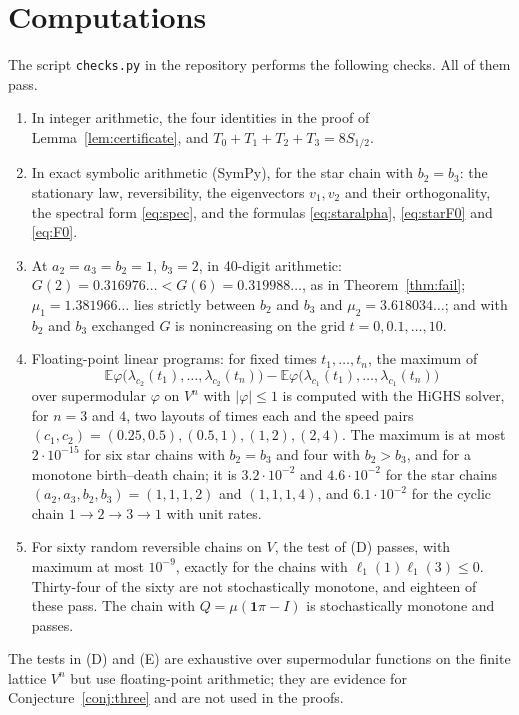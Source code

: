 \documentclass[11pt]{amsart}
\theoremstyle{remark}
\numberwithin{equation}{section}
\newcommand{\E}{\mathbb E}
\newcommand{\1}{\mathbf 1}
\begin{document}
\section{Computations}\label{sec:comp}

The script \texttt{checks.py} in the repository performs the following checks. All of them pass.
\begin{enumerate}[label=(\Alph*),leftmargin=*]
\item In integer arithmetic, the four identities in the proof of Lemma~\ref{lem:certificate}, and $T_0+T_1+T_2+T_3=8S_{1/2}$.
\item In exact symbolic arithmetic (SymPy), for the star chain with $b_2=b_3$: the stationary law, reversibility, the eigenvectors $v_1,v_2$ and their orthogonality, the spectral form \eqref{eq:spec}, and the formulas \eqref{eq:staralpha}, \eqref{eq:starF0} and \eqref{eq:F0}.
\item At $a_2=a_3=b_2=1$, $b_3=2$, in 40-digit arithmetic: $G(2)=0.316976\ldots<G(6)=0.319988\ldots$, as in Theorem~\ref{thm:fail}; $\mu_1=1.381966\ldots$ lies strictly between $b_2$ and $b_3$ and $\mu_2=3.618034\ldots$; and with $b_2$ and $b_3$ exchanged $G$ is nonincreasing on the grid $t=0,0.1,\dots,10$.
\item Floating-point linear programs: for fixed times $t_1,\dots,t_n$, the maximum of
\[
\E\varphi\bigl(\lambda_{c_2}(t_1),\dots,\lambda_{c_2}(t_n)\bigr)-\E\varphi\bigl(\lambda_{c_1}(t_1),\dots,\lambda_{c_1}(t_n)\bigr)
\]
over supermodular $\varphi$ on $V^n$ with $|\varphi|\le1$ is computed with the HiGHS solver, for $n=3$ and $4$, two layouts of times each and the speed pairs $(c_1,c_2)=(0.25,0.5),(0.5,1),(1,2),(2,4)$. The maximum is at most $2\cdot10^{-15}$ for six star chains with $b_2=b_3$ and four with $b_2>b_3$, and for a monotone birth--death chain; it is $3.2\cdot10^{-2}$ and $4.6\cdot10^{-2}$ for the star chains $(a_2,a_3,b_2,b_3)=(1,1,1,2)$ and $(1,1,1,4)$, and $6.1\cdot10^{-2}$ for the cyclic chain $1\to2\to3\to1$ with unit rates.
\item For sixty random reversible chains on $V$, the test of (D) passes, with maximum at most $10^{-9}$, exactly for the chains with $\ell_1(1)\ell_1(3)\le0$. Thirty-four of the sixty are not stochastically monotone, and eighteen of these pass. The chain with $Q=\mu(\1\pi-I)$ is stochastically monotone and passes.
\end{enumerate}
The tests in (D) and (E) are exhaustive over supermodular functions on the finite lattice $V^n$ but use floating-point arithmetic; they are evidence for Conjecture~\ref{conj:three} and are not used in the proofs.
\end{document}
